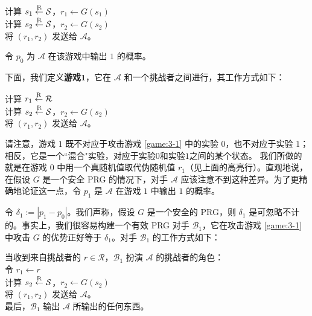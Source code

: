 \hspace*{5pt} 计算 $s_1\overset{\rm R}\leftarrow\mathcal S$，$r_1\leftarrow G(s_1)$\\
\hspace*{26pt} 计算 $s_2\overset{\rm R}\leftarrow\mathcal S$，$r_2\leftarrow G(s_2)$\\
\hspace*{26pt} 将 $(r_1,r_2)$ 发送给 $\mathcal A$。

\vspace*{5pt}

\noindent
令 $p_0$ 为 $\mathcal A$ 在该游戏中输出 $1$ 的概率。

下面，我们定义\textbf{游戏$\mathbf{1}$}，它在 $\mathcal A$ 和一个挑战者之间进行，其工作方式如下：

\vspace*{5pt}

\hspace*{2pt} \colorbox{gray!50}{计算 $r_1\overset{\rm R}\leftarrow\mathcal R$}\\
\hspace*{26pt} 计算 $s_2\overset{\rm R}\leftarrow\mathcal S$，$r_2\leftarrow G(s_2)$\\
\hspace*{26pt} 将 $(r_1,r_2)$ 发送给 $\mathcal A$。

\vspace*{5pt}

\noindent
请注意，游戏 $1$ 既不对应于攻击游戏 \ref{game:3-1} 中的实验 $0$，也不对应于实验 $1$；相反，它是一个``混合"实验，对应于实验$0$和实验$1$之间的某个状态。 我们所做的就是在游戏 $0$ 中用一个真随机值取代伪随机值 $r_1$（见上面的高亮行）。直观地说，在假设 $G$ 是一个安全 PRG 的情况下，对手 $\mathcal A$ 应该注意不到这种差异。为了更精确地论证这一点，令 $p_1$ 是 $\mathcal A$ 在游戏 $1$ 中输出 $1$ 的概率。

令 $\delta_1:=|p_1-p_0|$。我们声称，假设 $G$ 是一个安全的 PRG，则 $\delta_1$ 是可忽略不计的。事实上，我们很容易构建一个有效 PRG 对手 $\mathcal B_1$，它在攻击游戏 \ref{game:3-1} 中攻击 $G$ 的优势正好等于 $\delta_1$。对手 $\mathcal B_1$ 的工作方式如下：

\vspace*{5pt}

\hspace*{5pt} 当收到来自挑战者的 $r\in\mathcal R$，$\mathcal B_1$ 扮演 $\mathcal A$ 的挑战者的角色：\\
\hspace*{50pt} 令 $r_1\leftarrow r$\\
\hspace*{50pt} 计算 $s_2\overset{\rm R}\leftarrow\mathcal S$，$r_2\leftarrow G(s_2)$\\
\hspace*{50pt} 将 $(r_1,r_2)$ 发送给 $\mathcal A$。\\
\hspace*{26pt} 最后，$\mathcal B_1$ 输出 $\mathcal A$ 所输出的任何东西。

